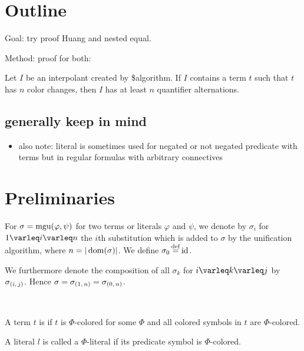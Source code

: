 \documentclass[,%
	draft=false,%
	numbers=noendperiod
	12pt,
	a4paper,
	oneside,%
	openany,
]{memoir}
\begin{document}

\section{ Outline }

Goal: try proof Huang and nested equal.

Method: proof for both:

\begin{cprop}
	Let $I$ be an interpolant created by \$algorithm.
	If $I$ contains a term $t$ such that $t$ has $n$ color changes, then $I$ has at least $n$ quantifier alternations.
\end{cprop}

\subsection{generally keep in mind}

\begin{itemize}
	\item also note: literal is sometimes used for negated or not negated predicate with terms but in regular formulas with arbitrary connectives
\end{itemize}

\section{ Preliminaries }

For $\sigma = \operatorname{mgu}(\varphi, \psi)$ for two terms or literals $\varphi$ and $\psi$, we denote by $\sigma_i$ for $1\varleq i \varleq n$ the $i$th substitution which is added to $\sigma$ by the unification algorithm, where $n = |\operatorname{dom}(\sigma)|$.
We define $\sigma_0 \defeq \id$.

We furthermore denote the composition of all $\sigma_k$ for $i\varleq k \varleq j$ by $\sigma_{(i,\,j)}$.
Hence $\sigma = \sigma_{(1,\,n)} = \sigma_{(0,\,n)}$.

~

A term $t$ is  if $t$ is $\Phi$-colored for some $\Phi$ and all colored symbols in $t$ are $\Phi$-colored.

A literal $l$ is called a $\Phi$-literal if its predicate symbol is $\Phi$-colored.
\end{document}
